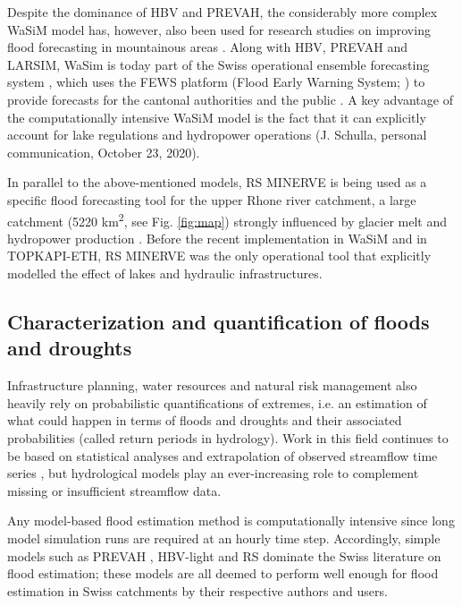 \documentclass[10pt,a4paper]{article}
\begin{document}
Despite the dominance of HBV and PREVAH, the considerably more complex WaSiM model has, however, also been used for research studies on improving flood forecasting in mountainous areas \citep{Jasper2003,Ahrens2003b,Jasper2002}. Along with HBV, PREVAH and LARSIM, WaSim is today part of the Swiss operational ensemble forecasting system \citep{Karsten2016}, which uses the FEWS platform (Flood Early Warning System; \citealp{Werner_2013}) to provide forecasts for the cantonal authorities and the public \citep{FOEN2019}. A key advantage of the computationally intensive WaSiM model is the fact that it can explicitly account for lake regulations and hydropower operations (J. Schulla, personal communication, October 23, 2020). 

In parallel to the above-mentioned models, RS MINERVE is being used as a specific flood forecasting tool for the upper Rhone river catchment, a large catchment (5220 km\textsuperscript{2}, see Fig. \ref{fig:map}) strongly influenced by glacier melt and hydropower production \citep{GarciaHernandez2009b,GarciaHernandez2009,Jordan2010}.  Before the recent implementation in WaSiM and in TOPKAPI-ETH, RS MINERVE was the only operational tool that explicitly modelled the effect of lakes and hydraulic infrastructures.

\subsection{Characterization and quantification of floods and droughts}
\label{sec:application:floodsdroughts}

Infrastructure planning, water resources and natural risk management also heavily rely on probabilistic quantifications of extremes, i.e. an estimation of what could happen in terms of floods and droughts and their associated probabilities (called return periods in hydrology). Work in this field continues to be based on statistical analyses and extrapolation of observed streamflow time series \citep{Brunner2018,Asadi20108}, but hydrological models play an ever-increasing role to complement missing or insufficient streamflow data.

Any model-based flood estimation method is computationally intensive since long model simulation runs are required at an hourly time step. Accordingly, simple models such as PREVAH \citep{Viviroli_2009,Viviroli2009c,Felder2017}, HBV-light \citep{Brunner_2019a,Sikorska2017,Sikorska-Senoner2020} and  RS \citep{Zeimetz2018,Zeimetz2017,Bieri2013} dominate the Swiss literature on flood estimation; these models are all deemed to perform well enough for flood estimation in Swiss catchments by their respective authors and users. 
\end{document}
